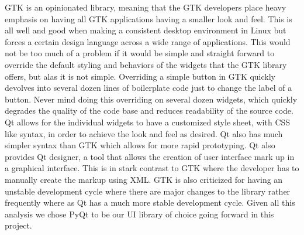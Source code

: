 GTK is an opinionated library, meaning that the GTK developers place heavy emphasis on having all GTK applications having a smaller look and feel. This is all well and good when making a consistent desktop environment in Linux but forces a certain design language across a wide range of applications. This would not be too much of a problem if it would be simple and straight forward to override the default styling and behaviors of the widgets that the GTK library offers, but alas it is not simple. Overriding a simple button in GTK quickly devolves into several dozen lines of boilerplate code just to change the label of a button. Never mind doing this overriding on several dozen widgets, which quickly degrades the quality of the code base and reduces readability of the source code.\\
Qt allows for the individual widgets to have a customized style sheet, with CSS like syntax, in order to achieve the look and feel as desired. Qt also has much simpler syntax than GTK which allows for more rapid prototyping. Qt also provides Qt designer, a tool that allows the creation of user interface mark up in a graphical interface. This is in stark contrast to GTK where the developer has to manually create the markup using XML. GTK is also criticized for having an unstable development cycle where there are major changes to the library rather frequently where as Qt has a much more stable development cycle. Given all this analysis we chose PyQt to be our UI library of choice going forward in this project.\\
